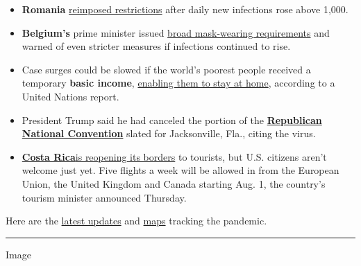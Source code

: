 \begin{itemize}
\item
  \textbf{Romania}
  \href{https://www.nytimes.com/2020/07/23/world/coronavirus-covid-19.html?action=click\&pgtype=Article\&state=default\&module=styln-coronavirus\&variant=show\&region=TOP_BANNER\&context=storylines_menu\#link-7aa50c66}{reimposed
  restrictions} after daily new infections rose above 1,000.
\item
  \textbf{Belgium's} prime minister issued
  \href{https://www.nytimes.com/reuters/2020/07/23/world/europe/23reuters-health-coronavirus-belgium.html}{broad
  mask-wearing requirements} and warned of even stricter measures if
  infections continued to rise.
\item
  Case surges could be slowed if the world's poorest people received a
  temporary \textbf{basic income},
  \href{https://www.nytimes.com/2020/07/23/world/coronavirus-covid-19.html?action=click\&pgtype=Article\&state=default\&module=styln-coronavirus\&variant=show\&region=TOP_BANNER\&context=storylines_menu\#link-7aa50c66}{enabling
  them to stay at home}, according to a United Nations report.
\item
  President Trump said he had canceled the portion of the
  \textbf{\href{https://www.nytimes.com/2020/07/23/us/politics/jacksonville-rnc.html}{Republican
  National Convention}} slated for Jacksonville, Fla., citing the virus.
\item
  \textbf{\href{https://www.nytimes.com/2020/07/23/world/coronavirus-covid-19.html}{Costa
  Rica}}\href{https://www.nytimes.com/2020/07/23/world/coronavirus-covid-19.html}{is
  reopening its borders} to tourists, but U.S. citizens aren't welcome
  just yet. Five flights a week will be allowed in from the European
  Union, the United Kingdom and Canada starting Aug. 1, the country's
  tourism minister announced Thursday.
\end{itemize}

Here are the
\href{https://www.nytimes.com/2020/07/23/world/coronavirus-covid-19.html?action=click\&pgtype=Article\&state=default\&module=styln-coronavirus\&variant=show\&region=TOP_BANNER\&context=storylines_menu}{latest
updates} and
\href{https://www.nytimes.com/interactive/2020/world/coronavirus-maps.html}{maps}
tracking the pandemic.

\begin{center}\rule{0.5\linewidth}{\linethickness}\end{center}

Image

